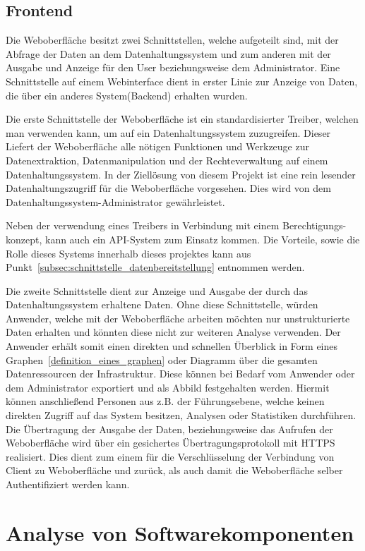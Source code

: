 \subsection{Frontend}
Die Weboberfläche besitzt zwei Schnittstellen, welche aufgeteilt sind, mit der
Abfrage der Daten an dem Datenhaltungssystem und zum anderen mit der Ausgabe
und Anzeige für den User beziehungsweise dem Administrator. Eine Schnittstelle
auf einem Webinterface dient in erster Linie zur Anzeige von Daten, die über
ein anderes System(Backend) erhalten wurden.

Die erste Schnittstelle der Weboberfläche ist ein standardisierter Treiber,
welchen man verwenden kann, um auf ein Datenhaltungssystem zuzugreifen. Dieser
Liefert der Weboberfläche alle nötigen Funktionen und Werkzeuge zur
Datenextraktion, Datenmanipulation und der Rechteverwaltung auf einem
Datenhaltungssystem. In der Ziellösung von diesem Projekt ist eine rein
lesender Datenhaltungszugriff für die Weboberfläche vorgesehen. Dies wird von
dem Datenhaltungssystem-Administrator gewährleistet.

Neben der verwendung eines Treibers in Verbindung mit einem Berechtigungs-
konzept, kann auch ein API-System zum Einsatz kommen. Die Vorteile, sowie die
Rolle dieses Systems innerhalb dieses projektes kann aus
Punkt~\ref{subsec:schnittstelle_datenbereitstellung} entnommen werden.

Die zweite Schnittstelle dient zur Anzeige und Ausgabe der durch das
Datenhaltungssystem erhaltene Daten. Ohne diese Schnittstelle, würden Anwender,
welche mit der Weboberfläche arbeiten möchten nur unstrukturierte Daten
erhalten und könnten diese nicht zur weiteren Analyse verwenden. Der Anwender
erhält somit einen direkten und schnellen Überblick in Form eines
Graphen~\ref{definition_eines_graphen} oder Diagramm über die gesamten
Datenressourcen der Infrastruktur. Diese können bei Bedarf vom Anwender oder
dem Administrator exportiert und als Abbild festgehalten werden. Hiermit können
anschließend Personen aus z.B. der Führungsebene, welche keinen direkten
Zugriff auf das System besitzen, Analysen oder Statistiken durchführen. Die
Übertragung der Ausgabe der Daten, beziehungsweise das Aufrufen der
Weboberfläche wird über ein gesichertes Übertragungsprotokoll mit HTTPS
realisiert. Dies dient zum einem für die Verschlüsselung der Verbindung von
Client zu Weboberfläche und zurück, als auch damit die Weboberfläche selber
Authentifiziert werden kann.
\mr%

\section{Analyse von Softwarekomponenten}
